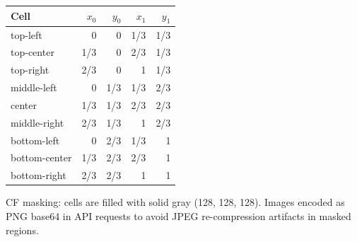 \documentclass[11pt]{article}
\begin{document}
\begin{center}
\small
\begin{tabular}{lrrrr}
\toprule
Cell & $x_0$ & $y_0$ & $x_1$ & $y_1$ \\
\midrule
top-left    & 0   & 0   & 1/3 & 1/3 \\
top-center  & 1/3 & 0   & 2/3 & 1/3 \\
top-right   & 2/3 & 0   & 1   & 1/3 \\
middle-left & 0   & 1/3 & 1/3 & 2/3 \\
center      & 1/3 & 1/3 & 2/3 & 2/3 \\
middle-right& 2/3 & 1/3 & 1   & 2/3 \\
bottom-left & 0   & 2/3 & 1/3 & 1   \\
bottom-center&1/3 & 2/3 & 2/3 & 1   \\
bottom-right& 2/3 & 2/3 & 1   & 1   \\
\bottomrule
\end{tabular}
\end{center}

\noindent CF masking: cells are filled with solid gray (128, 128, 128).
Images encoded as PNG base64 in API requests to avoid JPEG re-compression
artifacts in masked regions.
\end{document}
